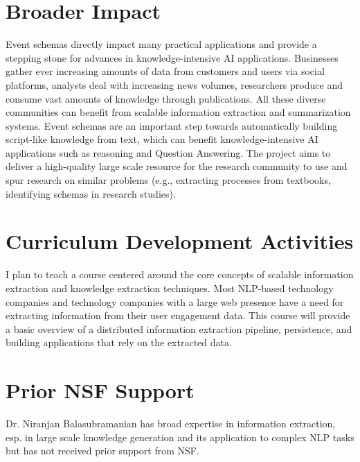 \section{Broader Impact}
Event schemas directly impact many practical applications and provide a stepping stone for advances in knowledge-intensive AI applications. Businesses gather ever increasing amounts of data from customers and users via social platforms, analysts deal with increasing news volumes, researchers produce and consume vast amounts of knowledge through publications. All these diverse communities can benefit from scalable information extraction and summarization systems. Event schemas are an important step towards automatically building script-like knowledge from text, which can benefit knowledge-intensive AI applications such as reasoning and Question Answering. The project aims to deliver a high-quality large scale resource for the research community to use and spur research on similar problems (e.g., extracting processes from textbooks, identifying schemas in research studies).

\section{Curriculum Development Activities}

I plan to teach a course centered around the core concepts of scalable information extraction and knowledge extraction techniques. Most NLP-based technology companies and technology companies with a large web presence have a need for extracting information from their user engagement data. This course will provide a basic overview of a distributed information extraction pipeline, persistence, and building applications that rely on the extracted data. 

\section{Prior NSF Support}

Dr. Niranjan Balasubramanian has broad expertise in information extraction, esp. in large scale knowledge generation and its application to complex NLP tasks but has not received prior support from NSF. 
